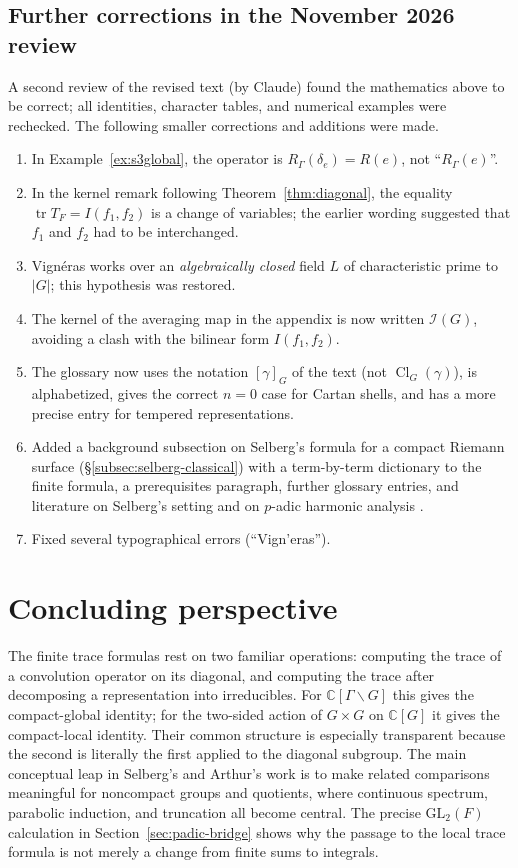 \documentclass[12pt]{article}
\theoremstyle{remark}
\newcommand{\C}{\mathbb C}
\newcommand{\tr}{\operatorname{tr}}
\begin{document}
\subsection*{Further corrections in the November 2026 review}
A second review of the revised text (by Claude) found the mathematics
above to be correct; all identities, character tables, and numerical
examples were rechecked.  The following smaller corrections and
additions were made.
\begin{enumerate}[leftmargin=*,itemsep=4pt]
\item In Example~\ref{ex:s3global}, the operator is
$R_\Gamma(\delta_e)=R(e)$, not ``$R_\Gamma(e)$''.
\item In the kernel remark following Theorem~\ref{thm:diagonal},
the equality $\tr T_F=I(f_1,f_2)$ is a change of variables; the
earlier wording suggested that $f_1$ and $f_2$ had to be interchanged.
\item Vign\'eras works over an \emph{algebraically closed} field $L$
of characteristic prime to $|G|$; this hypothesis was restored.
\item The kernel of the averaging map in the appendix is now written
$\mathcal I(G)$, avoiding a clash with the bilinear form $I(f_1,f_2)$.
\item The glossary now uses the notation $[\gamma]_G$ of the text
(not $\operatorname{Cl}_G(\gamma)$), is alphabetized, gives the
correct $n=0$ case for Cartan shells, and has a more precise entry
for tempered representations.
\item Added a background subsection on Selberg's formula for a
compact Riemann surface (\S\ref{subsec:selberg-classical}) with a
term-by-term dictionary to the finite formula, a prerequisites
paragraph, further glossary entries, and literature on Selberg's
setting and on $p$-adic harmonic analysis
\cite{Selberg1956,Hejhal1976,Iwaniec2002,Kottwitz2005}.
\item Fixed several typographical errors (``Vign'eras'').
\end{enumerate}

\section{Concluding perspective}
The finite trace formulas rest on two familiar operations:
computing the trace of a convolution operator on its diagonal, and
computing the trace after decomposing a representation into
irreducibles.  For $\C[\Gamma\backslash G]$ this gives the
compact-global identity; for the two-sided action of $G\times G$ on
$\C[G]$ it gives the compact-local identity.  Their common structure
is especially transparent because the second is literally the first
applied to the diagonal subgroup.  The main conceptual leap in
Selberg's and Arthur's work is to make related comparisons meaningful
for noncompact groups and quotients, where continuous spectrum,
parabolic induction, and truncation all become central. The precise
$\mathrm{GL}_2(F)$ calculation in Section~\ref{sec:padic-bridge}
shows why the passage to the local trace formula is not merely
a change from finite sums to integrals.
\end{document}
